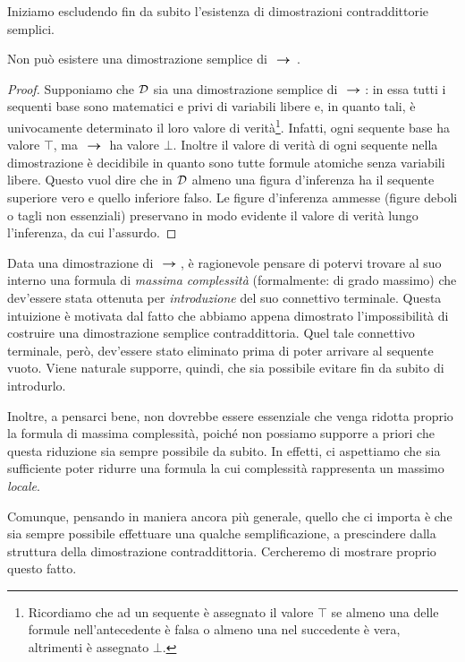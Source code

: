 		Iniziamo escludendo fin da subito l'esistenza di dimostrazioni contraddittorie semplici.
	\begin{lemma}
		Non può esistere una dimostrazione semplice di $\ \bm{\rightarrow} \; \,$.
	\end{lemma}
	\begin{proof}
		Supponiamo che $\mathcal{D}$ sia una dimostrazione semplice di $\ \bm{\rightarrow} \; $: in essa tutti i sequenti base sono matematici e privi di variabili libere e, in quanto tali, è univocamente determinato il loro valore di verità\footnote{Ricordiamo che ad un sequente è assegnato il valore $\top$ se almeno una delle formule nell'antecedente è falsa o almeno una nel succedente è vera, altrimenti è assegnato $\bot$.}. Infatti, ogni sequente base ha valore $\top$, ma $\ \bm{\rightarrow} \; $ ha valore $\bot$. Inoltre il valore di verità di ogni sequente nella dimostrazione è decidibile in quanto sono tutte formule atomiche senza variabili libere. Questo vuol dire che in $\mathcal{D}$ almeno una figura d'inferenza ha il sequente superiore vero e quello inferiore falso. Le figure d'inferenza ammesse (figure deboli o tagli non essenziali) preservano in modo evidente il valore di verità lungo l'inferenza, da cui l'assurdo.
	\end{proof}
		Data una dimostrazione di $\ \bm{\rightarrow} \; $, è ragionevole pensare di potervi trovare al suo interno una formula di \emph{massima complessità} (formalmente: di grado massimo) che dev'essere stata ottenuta per \emph{introduzione} del suo connettivo terminale. Questa intuizione è motivata dal fatto che abbiamo appena dimostrato l'impossibilità di costruire una dimostrazione semplice contraddittoria. 
		Quel tale connettivo terminale, però, dev'essere stato eliminato prima di poter arrivare al sequente vuoto. Viene naturale supporre, quindi, che sia possibile evitare fin da subito di introdurlo.
		
		Inoltre, a pensarci bene, non dovrebbe essere essenziale che venga ridotta proprio la formula di massima complessità, poiché non possiamo supporre a priori che questa riduzione sia sempre possibile da subito. In effetti, ci aspettiamo che sia sufficiente poter ridurre una formula la cui complessità rappresenta un massimo \emph{locale}.
		
		Comunque, pensando in maniera ancora più generale, quello che ci importa è che sia sempre possibile effettuare una qualche semplificazione, a prescindere dalla struttura della dimostrazione contraddittoria. Cercheremo di mostrare proprio questo fatto.
		
